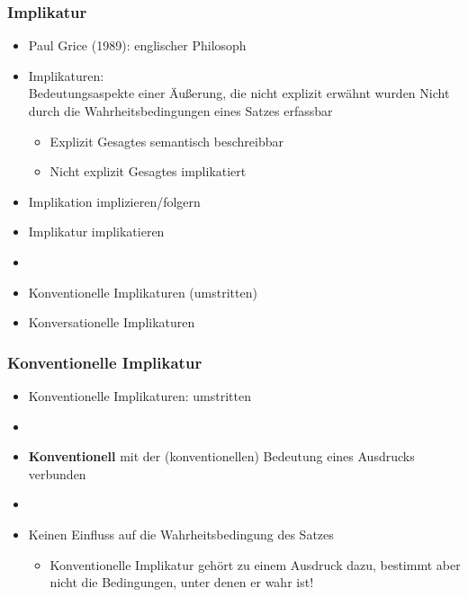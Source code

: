 \begin{frame}
\frametitle{Implikatur}

\begin{itemize}
	\item Paul Grice (1989): englischer Philosoph
	\item Implikaturen:\\
Bedeutungsaspekte einer Äu\ss{}erung, die nicht explizit erwähnt wurden \ras Nicht durch die Wahrheitsbedingungen eines Satzes erfassbar

	\begin{itemize}
		\item Explizit Gesagtes \ras semantisch beschreibbar
		\item Nicht explizit Gesagtes \ras implikatiert
	\end{itemize}


	\item Implikation \ras implizieren/folgern
	\item Implikatur \ras implikatieren
	\item[]
	\item Konventionelle Implikaturen (umstritten)
	\item Konversationelle Implikaturen
\end{itemize}

\end{frame}



\begin{frame}
\frametitle{Konventionelle Implikatur}

\begin{itemize}
	\item Konventionelle Implikaturen: umstritten
	\item[]
	\item \textbf{Konventionell} \ras mit der (konventionellen) Bedeutung eines Ausdrucks verbunden
	\item[]
	\item Keinen Einfluss auf die Wahrheitsbedingung des Satzes
	
	\begin{itemize}
	\item Konventionelle Implikatur gehört zu einem Ausdruck dazu, bestimmt aber nicht die Bedingungen, unter denen er wahr ist!
	\end{itemize}
	
\end{itemize}

\end{frame}


